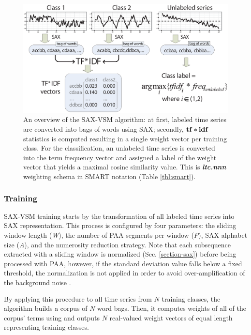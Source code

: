 \begin{figure}[t]
   \centering
   \includegraphics[width=148mm]{figures/SAX-VSM_overview.eps}
   \caption{
   An overview of the SAX-VSM algorithm: 
   at first, labeled time series are converted into bags of words using SAX; 
   secondly, $\text{\textbf{tf}}\ast\text{\textbf{idf}}$ statistics is computed resulting in 
   a single weight vector per training class. For the classification, an unlabeled 
   time series is converted into the term frequency vector and assigned a 
   label of the weight vector that yields a maximal cosine similarity value.
   This is \textit{\textbf{ltc.nnn}} weighting schema in SMART notation (Table \ref{tbl:smart}).}
   \label{fig:sax-vsm_overview}
\end{figure}

\subsubsection{Training}
SAX-VSM training starts by the transformation of all labeled time series into SAX representation. 
This process is configured by four parameters: 
the sliding window length (\textit{W}), 
the number of PAA segments per window (\textit{P}), 
SAX alphabet size (\textit{A}),
and the numerosity reduction strategy.
Note that each subsequence extracted with a sliding window is normalized (Sec. \ref{section-sax}) 
before being processed with PAA, however, if the standard deviation value falls below a fixed threshold, 
the normalization is not applied in order to avoid over-amplification of the background noise \cite{sax}. 

By applying this procedure to all time series from $N$ training classes, the algorithm builds a corpus of 
$N$ word bags. 
Then, it computes weights of all of the corpus' terms using \tfidf and outputs $N$ real-valued weight vectors of 
equal length representing training classes. 

